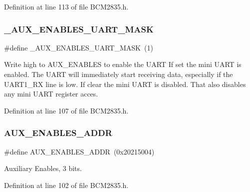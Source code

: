 Definition at line 113 of file B\+C\+M2835.\+h.

\mbox{\label{group__Auxilliary_gaa8e8d454e69ce6fa80fc26e805e21685}} 
\subsubsection{\texorpdfstring{\+\_\+\+A\+U\+X\+\_\+\+E\+N\+A\+B\+L\+E\+S\+\_\+\+U\+A\+R\+T\+\_\+\+M\+A\+SK}{\_AUX\_ENABLES\_UART\_MASK}}
{\footnotesize\ttfamily \#define \+\_\+\+A\+U\+X\+\_\+\+E\+N\+A\+B\+L\+E\+S\+\_\+\+U\+A\+R\+T\+\_\+\+M\+A\+SK~(1)}



Write high to A\+U\+X\+\_\+\+E\+N\+A\+B\+L\+ES to enable the U\+A\+RT If set the mini U\+A\+RT is enabled. The U\+A\+RT will immediately start receiving data, especially if the U\+A\+R\+T1\+\_\+\+RX line is low. If clear the mini U\+A\+RT is disabled. That also disables any mini U\+A\+RT register acces. 



Definition at line 107 of file B\+C\+M2835.\+h.

\mbox{\label{group__Auxilliary_gab0a21230d9d57f4131ce59a3c610593f}} 
\subsubsection{\texorpdfstring{A\+U\+X\+\_\+\+E\+N\+A\+B\+L\+E\+S\+\_\+\+A\+D\+DR}{AUX\_ENABLES\_ADDR}}
{\footnotesize\ttfamily \#define A\+U\+X\+\_\+\+E\+N\+A\+B\+L\+E\+S\+\_\+\+A\+D\+DR~(0x20215004)}



Auxiliary Enables, 3 bits. 



Definition at line 102 of file B\+C\+M2835.\+h.

